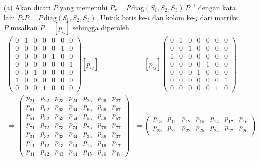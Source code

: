 \documentclass[11pt,a4paper]{article}
\theoremstyle{plain}
\theoremstyle{definition}
\theoremstyle{remark}
\begin{document}
\begin{enumerate}
\begin{enumerate}
	\begin{enumerate}
	\item[(a)] Akan dicari $P$ yang memenuhi $P_{\tau}=P\, \text{diag}(S_{1}, S_{2}, S_{3})\, P^{-1} $ dengan kata lain $P_{\tau}P = P\, \text{diag}(S_{1}, S_{2}, S_{3})$, Untuk baris ke-$i$ dan kolom ke-$j$ dari matriks $P$ misalkan $P=[p_{ij}]$ sehingga diperoleh
	\begin{align*}
	\begin{pmatrix}
	0 & 1 & 0 & 0 & 0 & 0 & 0\\ 
	0 & 0 & 0 & 0 & 0 & 1 & 0\\ 
	0 & 0 & 0 & 0 & 1 & 0 & 0\\ 
	0 & 0 & 0 & 0 & 0 & 0 & 1\\ 
	0 & 0 & 1 & 0 & 0 & 0 & 0\\ 
	1 & 0 & 0 & 0 & 0 & 0 & 0\\ 
	0 & 0 & 0 & 1 & 0 & 0 & 0
	\end{pmatrix} [p_{ij}] &= 
	[p_{ij}] \begin{pmatrix}
	0 & 1 & 0 & 0 & 0 & 0 & 0\\ 
	0 & 0 & 1 & 0 & 0 & 0 & 0\\ 
	1 & 0 & 0 & 0 & 0 & 0 & 0\\ 
	0 & 0 & 0 & 0 & 1 & 0 & 0\\ 
	0 & 0 & 0 & 1 & 0 & 0 & 0\\ 
	0 & 0 & 0 & 0 & 0 & 0 & 1\\ 
	0 & 0 & 0 & 0 & 0 & 1 & 0
	\end{pmatrix} \\
	\Rightarrow 
	\begin{pmatrix}
	p_{21} & p_{22} & p_{23} & p_{24} & p_{25} & p_{26} & p_{27}\\ 
	p_{61} & p_{62} & p_{63} & p_{64} & p_{65} & p_{66} & p_{67}\\ 
	p_{51} & p_{52} & p_{53} & p_{54} & p_{55} & p_{56} & p_{57}\\ 
	p_{71} & p_{72} & p_{73} & p_{74} & p_{75} & p_{76} & p_{77}\\ 
	p_{31} & p_{32} & p_{33} & p_{34} & p_{35} & p_{36} & p_{37}\\ 
	p_{11} & p_{12} & p_{13} & p_{14} & p_{15} & p_{16} & p_{17}\\ 
	p_{41} & p_{42} & p_{43} & p_{44} & p_{45} & p_{46} & p_{47}
	\end{pmatrix} &= 
	\begin{pmatrix}
	p_{13} & p_{11} & p_{12} & p_{15} & p_{14} & p_{17} & p_{16}\\ 
	p_{23} & p_{21} & p_{22} & p_{25} & p_{24} & p_{27} & p_{26}\\ 

\end{pmatrix}
\end{align*}
\end{enumerate}
\end{enumerate}
\end{enumerate}
\end{document}
